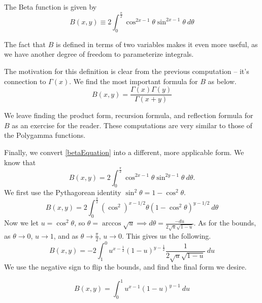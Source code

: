 \begin{defn}
The Beta function is given by
\begin{equation}\label{betaEquation}
\boxed{B(x,y) \equiv 2 \int_{0}^{\frac{\pi}{2}} \cos^{2x-1} \theta \sin^{2x-1} \theta \ d\theta}
\end{equation}
\end{defn}

The fact that $B$ is defined in terms of two variables makes it even more useful, as we have another degree of freedom to parameterize integrals.

The motivation for this definition is clear from the previous computation -- it's connection to $\Gamma(x)$.
We find the most important formula for $B$ as below.
\begin{equation}\label{betaGamma}
\boxed{B(x,y) = \frac{\Gamma(x)\Gamma(y)}{\Gamma(x+y)}}
\end{equation}

We leave finding the product form, recursion formula, and reflection formula for $B$ as an exercise for the reader.
These computations are very similar to those of the Polygamma functions.

Finally, we convert \eqref{betaEquation} into a different, more applicable form.
We know that 
$$B(x,y) = 2 \int_{0}^{\frac{\pi}{2}} \cos^{2x-1} \theta \sin ^{2y-1} \theta \ d\theta.$$
We first use the Pythagorean identity $\sin^2 \theta = 1 - \cos^2 \theta$.
$$B(x,y) = 2 \int_{0}^{\frac{\pi}{2}} (\cos^{2})^{x-1/2} \theta (1 - \cos^2 \theta)^{y-1/2} \ d\theta$$
Now we let $u = \cos^2 \theta$, so $\theta = \arccos \sqrt{u} \implies d\theta = \frac{-du}{2\sqrt{u}\sqrt{1 - u}}.$
As for the bounds, as $\theta \rightarrow 0$, $u \rightarrow 1$, and as $\theta \rightarrow \frac{\pi}{2}$, $u \rightarrow 0$.
This gives us the following.
$$B(x,y) = -2 \int_{1}^0 u^{x - \frac{1}{2}} (1 - u)^{y - \frac{1}{2}} \frac{1}{2\sqrt{u}\sqrt{1-u}} \ du$$
We use the negative sign to flip the bounds, and find the final form we desire.

\begin{equation}\label{betaEquationPolynomial}
\boxed{B(x,y) = \int_0^1 u^{x-1} (1-u)^{y-1} \ du}
\end{equation}

